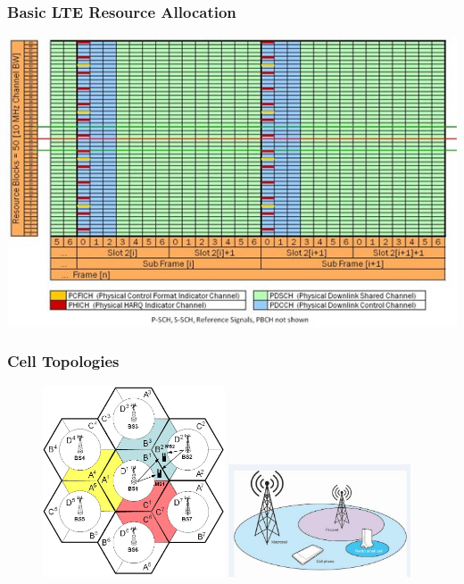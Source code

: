 \documentclass{beamer}
\begin{document}

\begin{frame}
\frametitle{Basic LTE Resource Allocation}
\begin{center}
  \includegraphics[width= 0.8\linewidth]{images/lte_frame.jpg}
\end{center}
\end{frame}


\begin{frame}
  \frametitle{Cell Topologies}
  \begin{center}
  \begin{figure}
    \centering\includegraphics[width=0.48\textwidth]{images/cells_layout.jpg}
    \hfill
    \centering\includegraphics[width=0.48\textwidth]{images/multi_tier.JPG}
  \end{figure}
  \end{center}
\end{frame}
\end{document}
